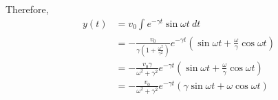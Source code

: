 \documentclass[../homework.tex]{subfiles}
\begin{document}
Therefore,
\begin{align*}
    y(t) & = v_0 \int_{}^{} e^{-\gamma t} \sin{\omega t}~dt                                                                                                 \\
         & = -\frac{v_0}{\gamma\left(1 + \frac{\omega^2}{\gamma^2}\right)} e^{-\gamma t} \left(\sin{\omega t} + \frac{\omega}{\gamma}\cos{\omega t} \right) \\
         & = -\frac{v_0 \gamma}{\omega^2 + \gamma^2} e^{-\gamma t} \left(\sin{\omega t} + \frac{\omega}{\gamma}\cos{\omega t} \right)                       \\
         & = -\frac{v_0}{\omega^2 + \gamma^2} e^{-\gamma t} \left(\gamma \sin{\omega t} + \omega \cos{\omega t} \right)
\end{align*}
\end{document}
